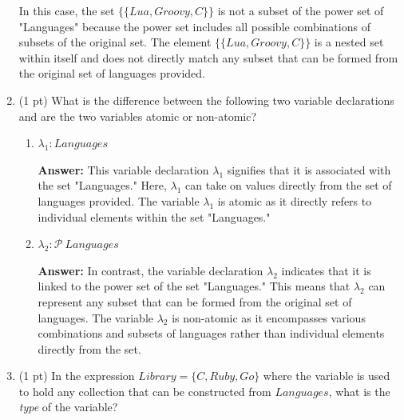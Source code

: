 \documentclass[12pt]{article}
\begin{document}
\begin{spacing}{1.5}
\begin{enumerate}
		      In this case, the set $\{\{Lua, Groovy, C\}\}$ is not a subset of the power set of "Languages" because the power set includes all possible combinations of subsets of the original set. The element $\{\{Lua, Groovy, C\}\}$ is a nested set within itself and does not directly match any subset that can be formed from the original set of languages provided.\\
		      		      		      		                  
		\item (1 pt) What is the difference between the following two variable declarations and are the two variables atomic or non-atomic?
		      		      		      		                  
		      \begin{enumerate}
		      	\item $\lambda_1 : Languages$
		      	      		      	      		      	      		      	      
		      	      \textbf{Answer:} This variable declaration $\lambda_1$ signifies that it is associated with the set "Languages." Here, $\lambda_1$ can take on values directly from the set of languages provided. The variable $\lambda_1$ is atomic as it directly refers to individual elements within the set "Languages."\\
		      	      		      	      		      	      		      	                  
		      	\item $\lambda_2 : \mathcal{P} \: Languages$
		      	      		      	      		      	      		      	          
		      	      \textbf{Answer:} In contrast, the variable declaration $\lambda_2$ indicates that it is linked to the power set of the set "Languages." This means that $\lambda_2$ can represent any subset that can be formed from the original set of languages. The variable $\lambda_2$ is non-atomic as it encompasses various combinations and subsets of languages rather than individual elements directly from the set.\\
		      	      		      	      		      	      		      	                  
		      \end{enumerate}
		      		      		      		      
		\item (1 pt) In the expression $Library = \{C, Ruby, Go\}$ where the variable is used to hold any collection that can be constructed from $Languages$, what is the \textit{type} of the variable?
		      		      		      		      

\end{enumerate}
\end{spacing}
\end{document}
